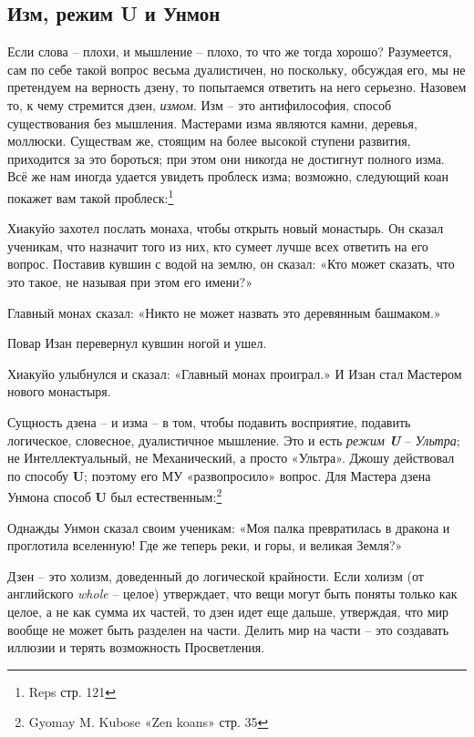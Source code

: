 \documentclass[../main.tex]{subfiles}
\begin{document}
\subsection{Изм, режим U и Унмон}

Если слова \--- плохи, и мышление \--- плохо, то что же тогда хорошо? Разумеется, сам по себе такой вопрос весьма дуалистичен, но поскольку, обсуждая его, мы не претендуем на верность дзену, то попытаемся ответить на него серьезно. Назовем то, к чему стремится дзен, \emph{измом}. Изм \--- это антифилософия, способ существования без мышления. Мастерами изма являются камни, деревья, моллюски. Существам же, стоящим на более высокой ступени развития, приходится за это бороться; при этом они никогда не достигнут полного изма. Всё же нам иногда удается увидеть проблеск изма; возможно, следующий коан покажет вам такой проблеск:\footnote{Reps стр. 121}

\begin{koan}
    Хиакуйо захотел послать монаха, чтобы открыть новый монастырь. Он сказал ученикам, что назначит того из них, кто сумеет лучше всех ответить на его вопрос. Поставив кувшин с водой на землю, он сказал: «Кто может сказать, что это такое, не называя при этом его имени?»

    Главный монах сказал: «Никто не может назвать это деревянным башмаком.»

    Повар Изан перевернул кувшин ногой и ушел.

    Хиакуйо улыбнулся и сказал: «Главный монах проиграл.» И Изан стал Мастером нового монастыря.
\end{koan}

Сущность дзена \--- и изма \--- в том, чтобы подавить восприятие, подавить логическое, словесное, дуалистичное мышление. Это и есть \emph{режим \textbf{U}} \--- \emph{Ультра}; не Интеллектуальный, не Механический, а просто «Ультра». Джошу действовал по способу \textbf{U}; поэтому его МУ «развопросило» вопрос. Для Мастера дзена Унмона способ \textbf{U} был естественным:\footnote{Gyomay M. Kubose «Zen koans» стр. 35}

\begin{koan}
    Однажды Унмон сказал своим ученикам: «Моя палка превратилась в дракона и проглотила вселенную! Где же теперь реки, и горы, и великая Земля?»
\end{koan}

Дзен \--- это холизм, доведенный до логической крайности. Если холизм (от английского \emph{whole} \--- целое) утверждает, что вещи могут быть поняты только как целое, а не как сумма их частей, то дзен идет еще дальше, утверждая, что мир вообще не может быть разделен на части. Делить мир на части \--- это создавать иллюзии и терять возможность Просветления.
\end{document}
